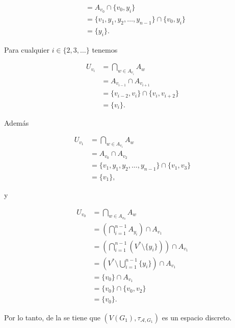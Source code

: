 \begin{Obs}
\begin{itemize}
\begin{ceqn}
\begin{align*}
                    &= A_{v_0}\cap \{v_0,y_i\}\\
                    &= \{v_1,y_1,y_2,\dots ,y_{n-1}\}\cap\{v_0,y_i\}\\
                    &= \{y_i\}.
         \end{align*}
         \end{ceqn}
         Para cualquier $i\in\{2,3,\dots\}$ tenemos
         \begin{ceqn}
         \begin{align*}
            U_{v_i} &= \bigcap_{w\in A_{v_i}}A_w \\
                    &= A_{v_{i-1}}\cap A_{v_{i+1}} \\
                    &= \{v_{i-2},v_i\}\cap\{v_i,v_{i+2}\}\\
                    &= \{v_i\}.
         \end{align*}
         \end{ceqn}
         Además
         \begin{ceqn}
         \begin{align*}
            U_{v_1} &= \bigcap_{w\in A_{v_1}}A_w \\
                    &= A_{v_0}\cap A_{v_2}\\
                    &= \{v_1,y_1,y_2,\dots ,y_{n-1}\}\cap\{v_1,v_3\}\\
                    &= \{v_1\},
         \end{align*}
         \end{ceqn}
         y
         \begin{ceqn}
         \begin{align*}
            U_{v_0} &= \bigcap_{w\in A_{v_0}}A_w \\
                    &= \left( \bigcap_{i=1}^{n-1} A_{y_i}\right)\cap A_{v_1} \\
                    &= \left( \bigcap_{i=1}^{n-1} \left( V^*\setminus \{y_i\}\right)\right) \cap A_{v_1} \\
                    &= \left( V^*\setminus\bigcup_{i=1}^{n-1} \{y_i\}\right)\cap A_{v_1} \\
                    &= \{v_0\}\cap A_{v_1} \\
                    &= \{v_0\}\cap \{v_0,v_2\} \\
                    &= \{v_0\}.
         \end{align*}
         \end{ceqn}
         Por lo tanto, de la  se tiene que $(V(G_1),\tau_{\mathcal{A},G_1})$ es un espacio discreto.

\end{itemize}
\end{Obs}
